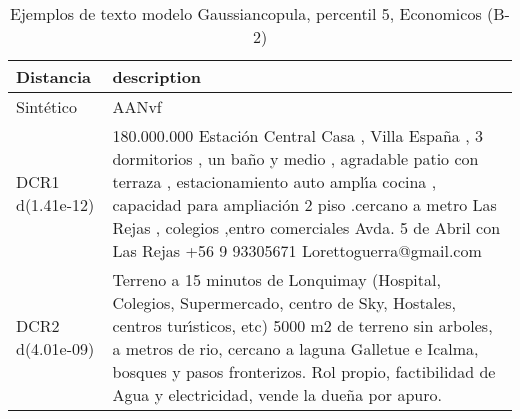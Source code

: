\begin{table}[H]
\centering
\fontsize{10}{14}\selectfont
\caption{Ejemplos de texto modelo Gaussiancopula, percentil 5, Economicos (B-2)}
\label{table-example-economicos-b-2-gaussiancopula-5p-text}
\begin{tabular}{|l|m{35em}|}
\hline
\rowcolor[gray]{0.8}
Distancia & description \\
\hline Sintético & AANvf \\
\hline DCR1 d(1.41e-12) & 180.000.000 Estaci\'on Central Casa , Villa Espa\~na , 3 dormitorios , un ba\~no y medio , agradable patio con terraza , estacionamiento auto ampl{\'\i}a cocina , capacidad para ampliaci\'on 2 piso .cercano a metro Las Rejas , colegios ,entro comerciales Avda. 5 de Abril con Las Rejas  +56 9 93305671 Lorettoguerra@gmail.com \\
\hline DCR2 d(4.01e-09) & Terreno a 15 minutos de Lonquimay (Hospital, Colegios, Supermercado, centro de Sky, Hostales, centros tur{\'\i}sticos, etc) 5000 m2 de terreno sin arboles, a metros de rio, cercano a laguna Galletue e Icalma, bosques y pasos fronterizos. Rol propio, factibilidad de Agua y electricidad, vende la due\~na por apuro. \\
\hline
\end{tabular}
\end{table}
